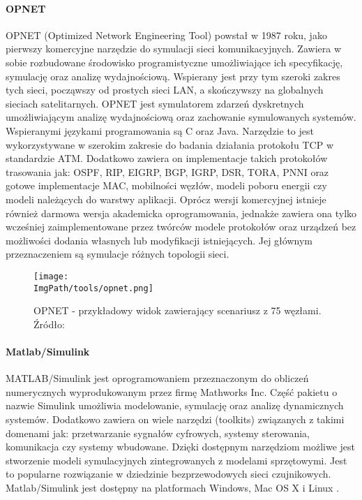 \paragraph{OPNET}
\cite{Fahmy2016}
OPNET (Optimized Network Engineering Tool) powstał w 1987 roku, jako pierwszy komercyjne narzędzie do symulacji sieci komunikacyjnych. Zawiera w sobie rozbudowane środowisko programistyczne umożliwiające ich specyfikację, symulację oraz analizę wydajnościową. Wspierany jest przy tym szeroki zakres tych sieci, począwszy od prostych sieci LAN, a skończywszy na globalnych sieciach satelitarnych. OPNET jest symulatorem zdarzeń dyskretnych umożliwiającym analizę wydajnościową oraz zachowanie symulowanych systemów. Wspieranymi językami programowania są C oraz Java. Narzędzie to jest wykorzystywane w szerokim zakresie do badania działania protokołu TCP w standardzie ATM. Dodatkowo zawiera on implementacje takich protokołów trasowania jak: OSPF, RIP, EIGRP, BGP, IGRP, DSR, TORA, PNNI oraz gotowe implementacje MAC, mobilności węzłów, modeli poboru energii czy modeli należących do warstwy aplikacji.
Oprócz wersji komercyjnej istnieje również darmowa wersja akademicka oprogramowania, jednakże zawiera ona tylko wcześniej zaimplementowane przez twórców modele protokołów oraz urządzeń bez możliwości dodania własnych lub modyfikacji istniejących. Jej głównym przeznaczeniem są symulacje różnych topologii sieci.
\begin{figure}[H]
	\begin{center}
		\centering
		\texttt{[image: \\ImgPath/tools/opnet.png]} 
	\end{center}
	\caption{OPNET - przykładowy widok zawierający scenariusz z 75 węzłami. Źródło: \cite{MarghescuC.2011Soaw}}
	\label{opnet}
\end{figure}
\paragraph{Matlab/Simulink}
MATLAB/Simulink jest oprogramowaniem przeznaczonym do obliczeń numerycznych wyprodukowanym przez firmę Mathworks Inc.  Część pakietu o nazwie Simulink umożliwia modelowanie, symulację oraz analizę dynamicznych systemów. Dodatkowo zawiera on wiele narzędzi (toolkits) związanych z takimi domenami jak: przetwarzanie sygnałów cyfrowych, systemy sterowania, komunikacja czy systemy wbudowane. Dzięki dostępnym narzędziom możliwe jest stworzenie modeli symulacyjnych zintegrowanych z modelami sprzętowymi. Jest to popularne rozwiązanie w dziedzinie bezprzewodowych sieci czujnikowych. Matlab/Simulink jest dostępny na platformach Windows, Mac OS X i Linux \cite{Rajaram2016}. 
